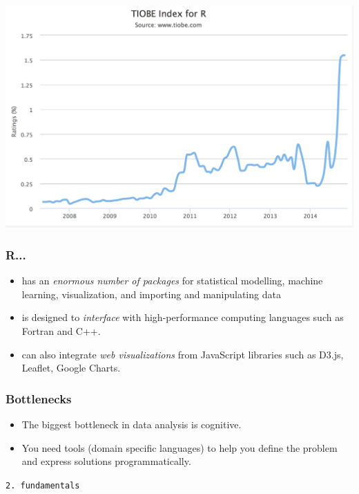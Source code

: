 \documentclass[10pt,c]{beamer}
\begin{document}
\begin{frame}[plain]
\begin{center}
\includegraphics[width=\textwidth]{img/tiobe_r.png}
\end{center}
\end{frame}
\endgroup
\begin{frame}
\frametitle{R...}
\begin{itemize}[<+->]
\item has an \emph{enormous number of packages} for statistical modelling, machine learning, visualization, and importing and manipulating data
\item is designed to \emph{interface} with high-performance computing
languages such as Fortran and C++.
\item can also integrate \emph{web visualizations} from JavaScript libraries such as D3.js,
Leaflet, Google Charts.
\end{itemize}
\end{frame}
\begin{frame}
\frametitle{Bottlenecks}
\begin{itemize}[<+->]
\item The biggest bottleneck in data analysis is cognitive.
\item You need tools (domain specific languages) to help you define the problem and express solutions programmatically.
\end{itemize}
\end{frame}
\begingroup
\begin{frame}[plain]
\vspace{1.5cm}
\begin{center}
\Large\texttt{2. fundamentals}
\end{center}
\end{frame}
\end{document}

